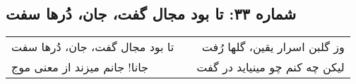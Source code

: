 \begin{center}
\section*{شماره ۳۳: تا بود مجال گفت، جان، دُرها سفت}
\label{sec:033}
\begin{longtable}{l p{0.5cm} r}
تا بود مجال گفت، جان، دُرها سفت
&&
وز گلبن اسرار یقین، گلها رُفت
\\
جانا! جانم میزند از معنی موج
&&
لیکن چه کنم چو مینیاید در گفت
\\
\end{longtable}
\end{center}
